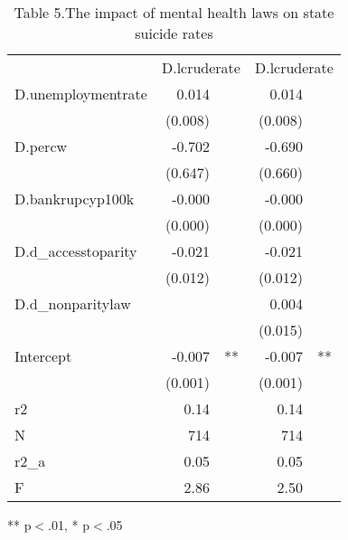\documentclass{article}
\begin{document}
\begin{table}[!h]
\caption{Table 5.The impact of mental health laws on state suicide rates}
\centering
\begin{tabular}{lllll}
\cline{1-5}
\multicolumn{1}{r}{} &
  \multicolumn{2}{c}{D.lcruderate} &
  \multicolumn{2}{c}{D.lcruderate} \\
\cline{1-5}
\multicolumn{1}{l}{D.unemploymentrate} &
  \multicolumn{1}{r}{0.014} &
  \multicolumn{1}{l}{} &
  \multicolumn{1}{r}{0.014} &
  \multicolumn{1}{l}{} \\
\multicolumn{1}{l}{} &
  \multicolumn{1}{r}{(0.008)} &
  \multicolumn{1}{l}{} &
  \multicolumn{1}{r}{(0.008)} &
  \multicolumn{1}{l}{} \\
\multicolumn{1}{l}{D.percw} &
  \multicolumn{1}{r}{-0.702} &
  \multicolumn{1}{l}{} &
  \multicolumn{1}{r}{-0.690} &
  \multicolumn{1}{l}{} \\
\multicolumn{1}{l}{} &
  \multicolumn{1}{r}{(0.647)} &
  \multicolumn{1}{l}{} &
  \multicolumn{1}{r}{(0.660)} &
  \multicolumn{1}{l}{} \\
\multicolumn{1}{l}{D.bankrupcyp100k} &
  \multicolumn{1}{r}{-0.000} &
  \multicolumn{1}{l}{} &
  \multicolumn{1}{r}{-0.000} &
  \multicolumn{1}{l}{} \\
\multicolumn{1}{l}{} &
  \multicolumn{1}{r}{(0.000)} &
  \multicolumn{1}{l}{} &
  \multicolumn{1}{r}{(0.000)} &
  \multicolumn{1}{l}{} \\
\multicolumn{1}{l}{D.d\_accesstoparity} &
  \multicolumn{1}{r}{-0.021} &
  \multicolumn{1}{l}{} &
  \multicolumn{1}{r}{-0.021} &
  \multicolumn{1}{l}{} \\
\multicolumn{1}{l}{} &
  \multicolumn{1}{r}{(0.012)} &
  \multicolumn{1}{l}{} &
  \multicolumn{1}{r}{(0.012)} &
  \multicolumn{1}{l}{} \\
\multicolumn{1}{l}{D.d\_nonparitylaw} &
  \multicolumn{1}{r}{} &
  \multicolumn{1}{l}{} &
  \multicolumn{1}{r}{0.004} &
  \multicolumn{1}{l}{} \\
\multicolumn{1}{l}{} &
  \multicolumn{1}{r}{} &
  \multicolumn{1}{l}{} &
  \multicolumn{1}{r}{(0.015)} &
  \multicolumn{1}{l}{} \\
\multicolumn{1}{l}{Intercept} &
  \multicolumn{1}{r}{-0.007} &
  \multicolumn{1}{l}{**} &
  \multicolumn{1}{r}{-0.007} &
  \multicolumn{1}{l}{**} \\
\multicolumn{1}{l}{} &
  \multicolumn{1}{r}{(0.001)} &
  \multicolumn{1}{l}{} &
  \multicolumn{1}{r}{(0.001)} &
  \multicolumn{1}{l}{} \\
\multicolumn{1}{l}{r2} &
  \multicolumn{1}{r}{0.14} &
  \multicolumn{1}{l}{} &
  \multicolumn{1}{r}{0.14} &
  \multicolumn{1}{l}{} \\
\multicolumn{1}{l}{N} &
  \multicolumn{1}{r}{714} &
  \multicolumn{1}{l}{} &
  \multicolumn{1}{r}{714} &
  \multicolumn{1}{l}{} \\
\multicolumn{1}{l}{r2\_a} &
  \multicolumn{1}{r}{0.05} &
  \multicolumn{1}{l}{} &
  \multicolumn{1}{r}{0.05} &
  \multicolumn{1}{l}{} \\
\multicolumn{1}{l}{F} &
  \multicolumn{1}{r}{2.86} &
  \multicolumn{1}{l}{} &
  \multicolumn{1}{r}{2.50} &
  \multicolumn{1}{l}{} \\
\cline{1-5}
\end{tabular}

\footnotesize{
** p$<$.01, * p$<$.05
}
\end{table}
\end{document}
